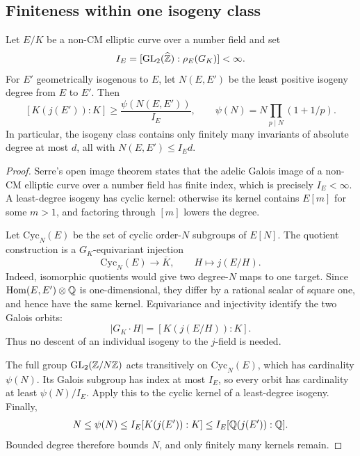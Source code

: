 \subsection{Finiteness within one isogeny class}

\begin{theorem}\label{thm:fixed-isogeny-degree-finiteness}
Let $E/K$ be a non-CM elliptic curve over a number field and set
\[
 I_E=[\operatorname{GL}_2(\widehat{\mathbb Z}):\rho_E(G_K)]<\infty.
\]
For $E'$ geometrically isogenous to $E$, let $N(E,E')$ be the least
positive isogeny degree from $E$ to $E'$. Then
\[
 [K(j(E')):K]\ge\frac{\psi(N(E,E'))}{I_E},\qquad
 \psi(N)=N\prod_{p\mid N}(1+1/p).
\]
In particular, the isogeny class contains only finitely many invariants
of absolute degree at most $d$, all with $N(E,E')\le I_Ed$.
\end{theorem}
\begin{proof}
Serre's open image theorem \cite{Serre} states that the adelic Galois
image of a non-CM elliptic curve over a number field has finite index,
which is precisely $I_E<\infty$. A least-degree isogeny has cyclic
kernel: otherwise its kernel contains $E[m]$ for some $m>1$, and
factoring through $[m]$ lowers the degree.

Let $\mathrm{Cyc}_N(E)$ be the set of cyclic order-$N$ subgroups of
$E[N]$. The quotient construction is a $G_K$-equivariant injection
\[
 \mathrm{Cyc}_N(E)\longrightarrow\overline K,
                \qquad H\longmapsto j(E/H).
\]
Indeed, isomorphic quotients would give two degree-$N$ maps to one
target. Since $\operatorname{Hom}(E,E')\otimes\mathbb Q$ is one-dimensional,
they differ by a rational scalar of square one, and hence have the
same kernel. Equivariance and injectivity identify the two Galois
orbits:
\[
             |G_K\cdot H|=[K(j(E/H)):K].
\]
Thus no descent of an individual isogeny to the $j$-field is needed.

The full group $\operatorname{GL}_2(\mathbb Z/N\mathbb Z)$ acts transitively on
$\mathrm{Cyc}_N(E)$, which has cardinality $\psi(N)$. Its Galois
subgroup has index at most $I_E$, so every orbit has cardinality at
least $\psi(N)/I_E$. Apply this to the cyclic kernel of a least-degree
isogeny. Finally,
\[
 N\le\psi(N)\le I_E[K(j(E')):K]
                 \le I_E[\mathbb Q(j(E')):\mathbb Q].
\]
Bounded degree therefore bounds $N$, and only finitely many kernels
remain.
\end{proof}

